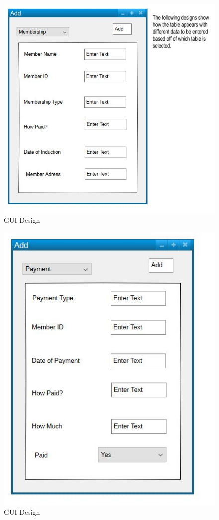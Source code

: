 \begin{figure}[H]
    \includegraphics[width=\textwidth]{Gui_3.JPG}
    \caption{GUI Design} \label{fig:GUI Designs}
\end{figure}

\begin{figure}[H]
    \includegraphics[width=\textwidth]{Gui_4.JPG}
    \caption{GUI Design} \label{fig:GUI Designs}
\end{figure}

